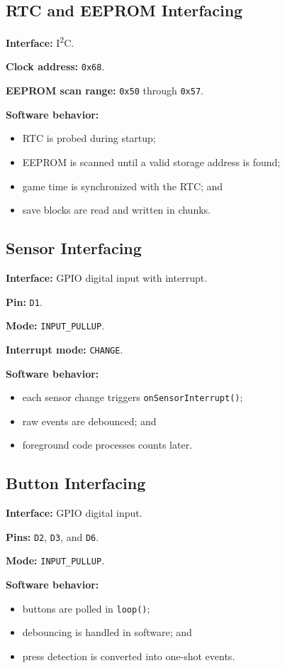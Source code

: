 \documentclass[conference]{IEEEtran}
\begin{document}
\subsection{RTC and EEPROM Interfacing}
\textbf{Interface:} I\textsuperscript{2}C.

\textbf{Clock address:} \texttt{0x68}.

\textbf{EEPROM scan range:} \texttt{0x50} through \texttt{0x57}.

\textbf{Software behavior:}
\begin{itemize}
\item RTC is probed during startup;
\item EEPROM is scanned until a valid storage address is found;
\item game time is synchronized with the RTC; and
\item save blocks are read and written in chunks.
\end{itemize}

\subsection{Sensor Interfacing}
\textbf{Interface:} GPIO digital input with interrupt.

\textbf{Pin:} \texttt{D1}.

\textbf{Mode:} \texttt{INPUT\_PULLUP}.

\textbf{Interrupt mode:} \texttt{CHANGE}.

\textbf{Software behavior:}
\begin{itemize}
\item each sensor change triggers \texttt{onSensorInterrupt()};
\item raw events are debounced; and
\item foreground code processes counts later.
\end{itemize}

\subsection{Button Interfacing}
\textbf{Interface:} GPIO digital input.

\textbf{Pins:} \texttt{D2}, \texttt{D3}, and \texttt{D6}.

\textbf{Mode:} \texttt{INPUT\_PULLUP}.

\textbf{Software behavior:}
\begin{itemize}
\item buttons are polled in \texttt{loop()};
\item debouncing is handled in software; and
\item press detection is converted into one-shot events.
\end{itemize}
\end{document}
